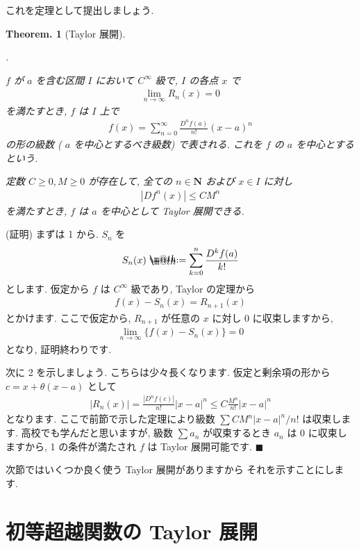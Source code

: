 \documentclass[openany, a4paper, oneside]{jsbook}
\makeatletter
\newcounter{enum2}
\renewenvironment{enumerate}{%
\begin{list}%
{%
\arabic{enum2}.\ \,%
}%
{%
\usecounter{enum2}
\setlength{\itemindent}{0pt}%
\setlength{\leftmargin}{15pt}%
\setlength{\rightmargin}{0pt}%
\setlength{\labelsep}{0pt}%
\setlength{\labelwidth}{6pt}%
\setlength{\itemsep}{0pt}%
\setlength{\parsep}{0pt}%
\setlength{\listparindent}{0pt}%
}
}{%
\end{list}%
}
\newcommand*{\defeq}{\mathrel{\rlap{%
\raisebox{0.3ex}{$\m@th\cdot$}}%
\raisebox{-0.3ex}{$\m@th\cdot$}}%
=}
\theoremstyle{break}
\newtheorem{thm}{Theorem.}[section]
\theoremstyle{breakdefn}
\newcommand{\abs}[1]{\left|#1\right|}
\makeatother
\begin{document}
これを定理として提出しましょう.
\begin{thm}[Taylor 展開]
 \begin{enumerate}
  \item $f$ が $a$ を含む区間 $I$ において $C^{\infty}$ 級で,  $I$ の各点 $x$ で
   \begin{align}
    \lim_{n \to \infty}R_n (x)=0
   \end{align}
   を満たすとき,  $f$ は $I$ 上で
   \begin{align}
    f (x)
    =
    \sum_{n=0}^{\infty}\frac{D^n f (a)}{n!}(x-a)^n
   \end{align}
   の形の級数 ( $a$ を中心とするべき級数) で表される.
   これを $f$ の $a$ を中心とするという.
  \item 定数 $C\geq 0,M\geq 0$ が存在して, 全ての $n \in \bm{N}$ および
   $x\in I$ に対し
   \begin{align}
   \abs{Df^n (x)}\leq CM^n
   \end{align}
   を満たすとき,  $f$ は $a$ を中心として Taylor 展開できる.
 \end{enumerate}
\end{thm}
(証明) まずは 1 から.  $S_n$ を
    \begin{align}
        S_n (x)\defeq \sum_{k=0}^n \frac{D^k f (a)}{k!}
    \end{align}
とします. 仮定から $f$ は $C^{\infty}$ 級であり, Taylor の定理から
    \begin{align}
        f (x)-S_n (x)=R_{n+1}(x)
    \end{align}
とかけます. ここで仮定から,  $R_{n+1}$ が任意の $x$ に対し $0$ に収束しますから,
    \begin{align}
        \lim_{n \to \infty}\{ f (x)-S_n (x) \} =0
    \end{align}
となり, 証明終わりです.

次に 2 を示しましょう. こちらは少々長くなります.
仮定と剰余項の形から $c=x+\theta (x-a)$ として
    \begin{align}
        |R_n (x)|=\frac{|D^nf (c)|}{n!}|x-a|^n \leq C\frac{M^n}{n!}|x-a|^n
    \end{align}
となります. ここで前節で示した定理により級数
 $\sum CM^n|x-a|^n/n!$ は収束します.
高校でも学んだと思いますが,
級数 $\sum a_n$ が収束するとき $a_n$ は 0 に収束しますから, 1 の条件が満たされ
 $f$ は Taylor 展開可能です.  $\blacksquare$

次節ではいくつか良く使う Taylor 展開がありますから
それを示すことにします.
\section{初等超越関数の Taylor 展開}
\end{document}
